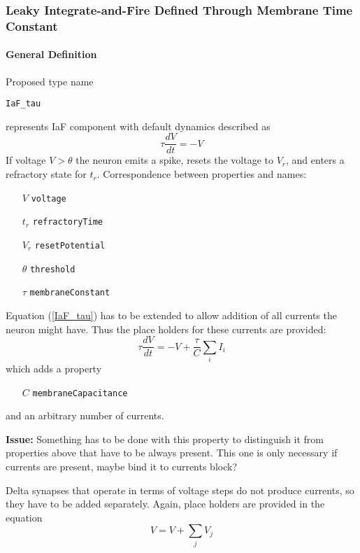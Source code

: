 \documentclass{article}
\newcommand{\issue}[1]{%
\begin{center}
\colorbox{issuecolor}{\parbox{0.8\linewidth}{\textbf{Issue:} #1}}
\end{center}%
}
\begin{document}
\subsubsection{Leaky Integrate-and-Fire Defined Through Membrane
Time Constant}
\label{IaF_tau_Desc}

\paragraph{General Definition}
Proposed type name {\begin{verbatim}IaF_tau\end{verbatim}} represents IaF
component with default dynamics described as
\begin{equation}
\tau\frac{dV}{dt}=-V
\label{IaF_tau}
\end{equation}
If voltage $V>\theta$ the neuron emits a spike, resets the voltage to
$V_r$, and enters a refractory state for $t_r$. Correspondence between
properties and names:
\begin{itemize}
\item[$V$] {\tt voltage}
\item[$t_r$] {\tt refractoryTime}
\item[$V_r$] {\tt resetPotential}
\item[$\theta$] {\tt threshold}
\item[$\tau$] {\tt membraneConstant}
\end{itemize}
Equation (\ref{IaF_tau}) has to be extended to allow addition of all
currents the neuron might have. Thus the place holders for these currents
are provided:
\begin{equation}
\tau\frac{dV}{dt}=-V+\frac{\tau}{C}\sum_i{I_i}
\label{IaF_tau_full}
\end{equation}
which adds a property
\begin{itemize}
\item[$C$] {\tt membraneCapacitance}
\end{itemize}
and an arbitrary number of currents.

\issue{Something has to be done with this property to distinguish it
from properties above that have to be always present. This one is
only necessary if currents are present, maybe bind it to currents
block?}

Delta synapses that operate in terms of voltage steps do not produce
currents, so they have to be added separately. Again, place holders
are provided in the equation
\begin{equation}
V=V+\sum_j{V_j}
\label{IaF_tau_delta}
\end{equation}
\end{document}
